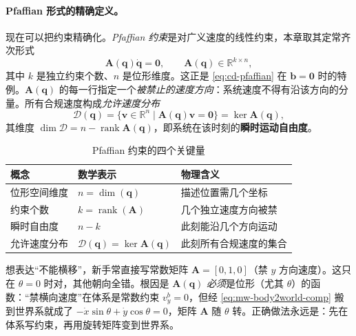 \paragraph{Pfaffian 形式的精确定义。}
现在可以把约束精确化。\emph{Pfaffian 约束}是对广义速度的线性约束，本章取其定常齐次形式
\begin{equation}
  \mathbf{A}(\mathbf{q})\dot{\mathbf{q}}=\mathbf{0},\qquad \mathbf{A}(\mathbf{q})\in\mathbb{R}^{k\times n},
  \label{eq:mw-pfaffian}
\end{equation}
其中 $k$ 是独立约束个数、$n$ 是位形维度。这正是 \cref{eq:cd-pfaffian} 在 $\mathbf{b}=\mathbf{0}$ 时的特例。$\mathbf{A}(\mathbf{q})$ 的每一行指定一个\emph{被禁止的速度方向}：系统速度不得有沿该方向的分量。所有合规速度构成\emph{允许速度分布}
\begin{equation}
  \mathcal{D}(\mathbf{q})=\{\mathbf{v}\in\mathbb{R}^n\mid\mathbf{A}(\mathbf{q})\mathbf{v}=\mathbf{0}\}=\ker\mathbf{A}(\mathbf{q}),
  \label{eq:mw-distribution}
\end{equation}
其维度 $\dim\mathcal{D}=n-\operatorname{rank}\mathbf{A}(\mathbf{q})$，即系统在该时刻的\textbf{瞬时运动自由度}。

\begin{table}[H]\centering\small
\caption{Pfaffian 约束的四个关键量}
\begin{tabular}{lll}
\toprule
概念 & 数学表示 & 物理含义 \\
\midrule
位形空间维度 & $n=\dim(\mathbf{q})$ & 描述位置需几个坐标 \\
约束个数 & $k=\operatorname{rank}(\mathbf{A})$ & 几个独立速度方向被禁 \\
瞬时自由度 & $n-k$ & 此刻能沿几个方向运动 \\
允许速度分布 & $\mathcal{D}(\mathbf{q})=\ker\mathbf{A}(\mathbf{q})$ & 此刻所有合规速度的集合 \\
\bottomrule
\end{tabular}
\end{table}

\begin{pitfall}
想表达“不能横移”，新手常直接写常数矩阵 $\mathbf{A}=[0,1,0]$（禁 $y$ 方向速度）。这只在 $\theta=0$ 时对，其他朝向全错。根因是 $\mathbf{A}(\mathbf{q})$ \emph{必须}是位形（尤其 $\theta$）的函数：“禁横向速度”在体系是常数约束 $v_y^b=0$，但经 \cref{eq:mw-body2world-comp} 搬到世界系就成了 $-\dot x\sin\theta+\dot y\cos\theta=0$，矩阵 $\mathbf{A}$ 随 $\theta$ 转。正确做法永远是：先在体系写约束，再用旋转矩阵变到世界系。
\end{pitfall}


